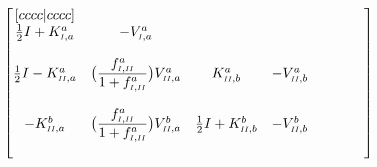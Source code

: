 \documentclass{article}
\newcommand{\RomCap}[1]
    {\MakeUppercase{\scaleto{\romannumeral #1}{3.5pt}}}
\newcommand{\myfrac}[3][0pt]{\genfrac{}{}{}{}{\raisebox{#1}{$#2$}}{\raisebox{-#1}{$#3$}}}
\begin{document}
    \begin{equation}
    	\begin{bmatrix}[cccc|cccc]
    		\\
            \iffalse
	     	Row 1 : A_{11} & A_{12} &
			\fi

            \frac{1}{2}I+K^{a}_{\RomCap{1},a} & -V^{a}_{\RomCap{1},a} & 	

            \iffalse
	     	A_{31} & A_{41} & A_{51} & A_{61} & A_{71} & A_{81} \\
			\fi

             &  &  &  &  &  \\ 
             &  &  &  &  &  &  & \\
	     	
	     	\iffalse
	     	Row 2 : A_{21} &
			\fi
			
			\frac{1}{2}I-K^{a}_{\RomCap{2},a} & 	
			
			\iffalse
	     	A_{22} &
			\fi
	     	
	     	\big(\myfrac[3pt]{f_{\RomCap{1},\RomCap{2}}^{a}}{1+f_{\RomCap{1},\RomCap{2}}^{a}}\big)V^{a}_{\RomCap{2},a} &
	     	
	     	\iffalse
	     	A_{23} & A_{24} &
			\fi

			K^{a}_{\RomCap{2},b} & -V^{a}_{\RomCap{2},b} & 

	     	\iffalse
	     	A_{25} & A_{26} & A_{27} & A_{28} \\
	     	\fi
			
	     	 &	 &  &  \\ 
             &  &  &  &  &  &  & \\
	     	\iffalse
	     	Row 3 : A_{31} &
			\fi
			
			-K^{b}_{\RomCap{2},a} & 	
			
			\iffalse
	     	A_{32} &
			\fi
	     	
	     	\big(\myfrac[3pt]{f_{\RomCap{1},\RomCap{2}}^{a}}{1+f_{\RomCap{1},\RomCap{2}}^{a}}\big)V^{b}_{\RomCap{2},a} &
	     	
	     	\iffalse
	     	A_{33} & A_{34} &
			\fi

			\frac{1}{2}I+K^{b}_{\RomCap{2},b} & -V^{b}_{\RomCap{2},b} &

	     	\iffalse
	     	A_{35} & A_{36} & A_{37} & A_{38} \\
	     	\fi
			
	     	 &	 &  & \\ 
             &  &  &  &  &  &  & \\
	     	\iffalse
	     	Row 4 : A_{41} & A_{42} &
			\fi
			

\end{bmatrix}
\end{equation}
\end{document}
